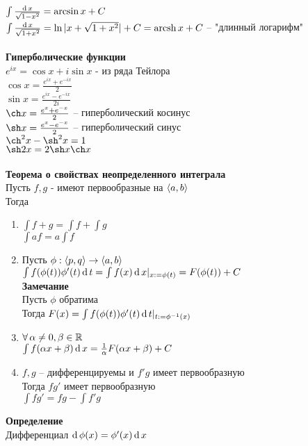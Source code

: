 \documentclass[12pt]{article}
\begin{document}
$\int \frac{\operatorname{d} x}{\sqrt{1-x^2}} = \arcsin x + C$\\
$\int \frac{\operatorname{d} x}{\sqrt{1+x^2}} = \ln |x+\sqrt{1+x^2}| + C= \operatorname{arcsh} x + C$ -- "длинный логарифм"\\\\
\textbf{Гиперболические функции}\\
$e^{ix} = \cos x + i\sin x$ - из ряда Тейлора\\
$\cos x = \frac{e^{ix}+e^{-ix}}2$\\
$\sin x = \frac{e^{ix}-e^{-ix}}{2i}$\\
$\ch x = \frac{e^{x}+e^{-x}}2$ -- гиперболический косинус\\
$\sh x = \frac{e^{x}-e^{-x}}2$ -- гиперболический синус\\
$\ch^2 x - \sh^2 x = 1$\\
$\sh 2x = 2\sh x \ch x$\\\\
\textbf{Теорема о свойствах неопределенного интеграла}\\
Пусть $f, g$ - имеют первообразные на $\langle a, b \rangle$\\
Тогда
\begin{enumerate}
    \item $\int f + g = \int f + \int g$\\
    $\int af = a\int f$
    \item Пусть $\phi: \langle p, q \rangle \rightarrow \langle a, b \rangle$\\
    $\int f(\phi(t))\phi'(t)\operatorname{d} t = \int f(x)\operatorname{d} x |_{x:= \phi(t)} = F(\phi(t)) + C$\\
    \textbf{Замечание}\\
    Пусть $\phi$ обратима\\
    Тогда $F(x) = \int f(\phi(t))\phi'(t)\operatorname{d} t |_{t:= \phi^{-1}(x)}$
    \item $\forall\, \alpha \neq 0, \beta \in \mathbb{R}$\\
    $\int f(\alpha x + \beta)\operatorname{d} x = \frac1\alpha F(\alpha x + \beta) + C$
    \item $f, g$ -- дифференцируемы и $f'g$ имеет первообразную\\
    Тогда $fg'$ имеет первообразную\\
    $\int fg' = fg - \int f'g$
\end{enumerate}
\textbf{Определение}\\
Дифференциал $\operatorname{d} \phi(x) = \phi'(x)\operatorname{d} x$\\
\end{document}
